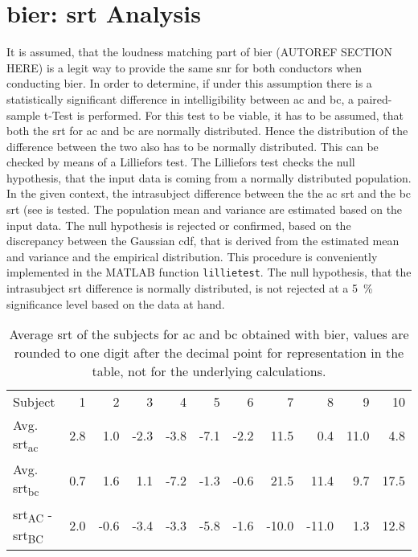 \section{\gls{bier}: \gls{srt} Analysis}

It is assumed, that the loudness matching part of \gls{bier} (AUTOREF SECTION HERE) is a legit way to provide the same \gls{snr} for both conductors when conducting \gls{bier}.
In order to determine, if under this assumption there is a statistically significant difference in intelligibility between \gls{ac} and \gls{bc}, a paired-sample t-Test is performed.
For this test to be viable, it has to be assumed, that both the \gls{srt} for \gls{ac} and \gls{bc} are normally distributed. Hence the distribution of the difference between the two also has to be normally distributed. 
This can be checked by means of a Lilliefors test.
The Lilliefors test checks the null hypothesis, that the input data is coming from a normally distributed population. 
In the given context, the intrasubject difference between the the \gls{ac} \gls{srt} and the \gls{bc} \gls{srt} (see  is tested.
The population mean and variance are estimated based on the input data. The null hypothesis is rejected or confirmed, based on the discrepancy between the Gaussian \gls{cdf}, that is derived from the estimated mean and variance and the empirical distribution.
This procedure is conveniently implemented in the MATLAB\textsuperscript{\textregistered} function \texttt{lillietest}.
The null hypothesis, that the intrasubject \gls{srt} difference is normally distributed, is not rejected at a \SI{5}{\percent} significance level based on the data at hand.\\



 
\begin{table}[H]
\centering
\caption{Average \gls{srt} of the subjects for \gls{ac} and \gls{bc} obtained with \gls{bier}, values are rounded to one digit after the decimal point for representation in the table, not for the underlying calculations.}
\label{tab:srt}
\begin{tabular}{lrrrrrrrrrr}
Subject     & 1   & 2    & 3    & 4    & 5    & 6    & 7     & 8     & 9    & 10   \\
Avg. \gls{srt}\textsubscript{\gls{ac}} & 2.8 & 1.0  & -2.3 & -3.8 & -7.1 & -2.2 & 11.5  & 0.4   & 11.0 & 4.8  \\
Avg. \gls{srt}\textsubscript{\gls{bc}} & 0.7 & 1.6  & 1.1  & -7.2 & -1.3 & -0.6 & 21.5  & 11.4  & 9.7  & 17.5 \\
\gls{srt}\textsubscript{AC} - \gls{srt}\textsubscript{BC}  & 2.0 & -0.6 & -3.4 & -3.3 & -5.8 & -1.6 & -10.0 & -11.0 & 1.3  & 12.8
\end{tabular}
\end{table}

